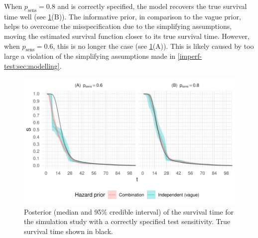 \documentclass[12pt, letterpaper]{article} %
\newcommand{\psens}{p_\text{sens}}
\begin{document}
When $\psens = 0.8$ and is correctly specified, the model recovers the true survival time well (see \cref{imperf-test:fig:constant-test-sensitivity}(B)).
The informative prior, in comparison to the vague prior, helps to overcome the misspecification due to the simplifying assumptions, moving the estimated survival function closer to its true survival time.
However, when $\psens = 0.6$, this is no longer the case (see \cref{imperf-test:fig:constant-test-sensitivity}(A)).
This is likely caused by too large a violation of the simplifying assumptions made in \cref{imperf-test:sec:modelling}.
\begin{figure}
  \includegraphics[width=\textwidth]{cis-imperfect-testing/sim-constant-sensitivity}
  \caption[Simulation study results with constant test sensitivity]{%
    Posterior (median and 95\% credible interval) of the survival time for the simulation study with a correctly specified test sensitivity.
    True survival time shown in black.
  }
  \label{imperf-test:fig:constant-test-sensitivity}
\end{figure}
\end{document}
